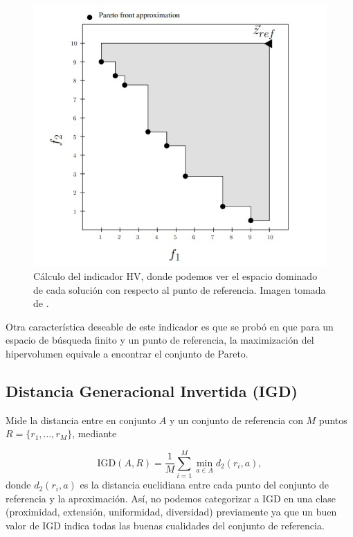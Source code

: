 \begin{figure}[H]
    \centering
    \includegraphics[scale=.6]{./Figuras/HV.jpg} 
    \caption[Hipervolumen]{Cálculo del indicador HV, donde podemos ver el espacio dominado de cada solución con respecto al punto de referencia. Imagen tomada de \cite{tesis_mst_guillermo}.}
    \label{fig:HV}
\end{figure}

Otra característica deseable de este indicador es que se probó en \cite{Measure_Pareto_Optima} que para un espacio de búsqueda finito y un punto de referencia, la maximización del hipervolumen equivale a encontrar el conjunto de Pareto. 

\subsection{Distancia Generacional Invertida (IGD)} \label{sec:IGD}
Mide la distancia entre en conjunto $A$ y un conjunto de referencia con $M$ puntos $R=\{r_1,\ldots,r_M\}$, mediante

\begin{equation} \label{eq:IGD}
    \text{IGD}(A,R)=\frac{1}{M}\sum_{i=1}^M \min_{a\in A} d_2(r_i,a), \nonumber
\end{equation}
donde $d_2(r_i,a)$ es la distancia euclidiana entre cada punto del conjunto de referencia y la aproximación. Así, no podemos categorizar a IGD en una clase (proximidad, extensión, uniformidad, diversidad) previamente ya que un buen valor de IGD indica todas las buenas cualidades del conjunto de referencia. 

